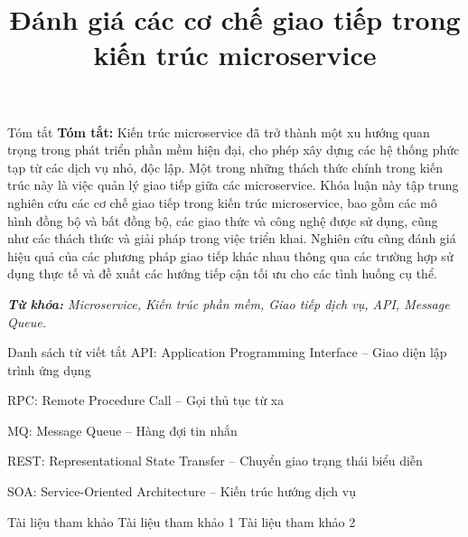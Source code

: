 \documentclass{uetgraduation}
\title{Đánh giá các cơ chế giao tiếp trong kiến trúc microservice}
\begin{document}
\makecovers

\begin{preamble}{Tóm tắt}
    \textbf{Tóm tắt:} Kiến trúc microservice đã trở thành một xu hướng quan trọng trong phát triển phần mềm hiện đại, cho phép xây dựng các hệ thống phức tạp từ các dịch vụ nhỏ, độc lập. Một trong những thách thức chính trong kiến trúc này là việc quản lý giao tiếp giữa các microservice. Khóa luận này tập trung nghiên cứu các cơ chế giao tiếp trong kiến trúc microservice, bao gồm các mô hình đồng bộ và bất đồng bộ, các giao thức và công nghệ được sử dụng, cũng như các thách thức và giải pháp trong việc triển khai. Nghiên cứu cũng đánh giá hiệu quả của các phương pháp giao tiếp khác nhau thông qua các trường hợp sử dụng thực tế và đề xuất các hướng tiếp cận tối ưu cho các tình huống cụ thể.

    \textit{\textbf{Từ khóa:} Microservice, Kiến trúc phần mềm, Giao tiếp dịch vụ, API, Message Queue.}
\end{preamble}

\begin{contentlisting}
    \tableofcontents
    \listoffigures
    \listoftables

    \begin{contentlistingsection}{Danh sách từ viết tắt}
        API: Application Programming Interface -- Giao diện lập trình ứng dụng

        RPC: Remote Procedure Call -- Gọi thủ tục từ xa

        MQ: Message Queue -- Hàng đợi tin nhắn

        REST: Representational State Transfer -- Chuyển giao trạng thái biểu diễn

        SOA: Service-Oriented Architecture -- Kiến trúc hướng dịch vụ
    \end{contentlistingsection}
\end{contentlisting}







\begin{thebibliography}{99}
    \begin{bibsection}{Tài liệu tham khảo}
         Tài liệu tham khảo 1
         Tài liệu tham khảo 2
    \end{bibsection}
\end{thebibliography}
\end{document}
